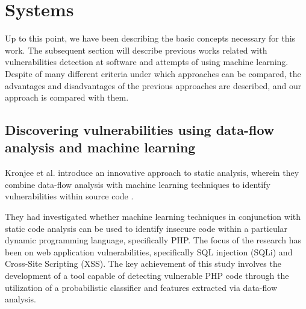 


\section{Systems} %
\label{sec:	Systems}

Up to this point, we have been describing the basic concepts necessary for this work. The subsequent section will describe previous works related with vulnerabilities detection at software and attempts of using machine learning. Despite of many different criteria under which approaches can be compared, the advantages and disadvantages of the previous approaches are described, and our approach is compared with them.

\subsection{Discovering vulnerabilities using data-flow analysis and machine learning} %
\label{sec:	Discovering_vulnerabilities_using_data_flow_analysis_and_machine_learning}

Kronjee et al. introduce an innovative approach to static analysis, wherein they combine data-flow analysis with machine learning techniques to identify vulnerabilities within source code \cite{Kronjee2018}.

They had investigated whether machine learning techniques in conjunction with static code analysis can be used to identify insecure code within a particular dynamic programming language, specifically PHP. The focus of the research has been on web application vulnerabilities, specifically SQL injection (SQLi) and Cross-Site Scripting (XSS). The key achievement of this study involves the development of a tool capable of detecting vulnerable PHP code through the utilization of a probabilistic classifier and features extracted via data-flow analysis.

